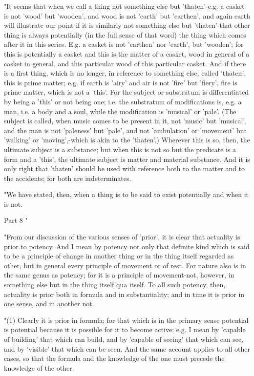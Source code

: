 "It seems that when we call a thing not something else but 'thaten'-e.g.
a casket is not 'wood' but 'wooden', and wood is not 'earth' but 'earthen',
and again earth will illustrate our point if it is similarly not something
else but 'thaten'-that other thing is always potentially (in the full
sense of that word) the thing which comes after it in this series.
E.g. a casket is not 'earthen' nor 'earth', but 'wooden'; for this
is potentially a casket and this is the matter of a casket, wood in
general of a casket in general, and this particular wood of this particular
casket. And if there is a first thing, which is no longer, in reference
to something else, called 'thaten', this is prime matter; e.g. if
earth is 'airy' and air is not 'fire' but 'fiery', fire is prime matter,
which is not a 'this'. For the subject or substratum is differentiated
by being a 'this' or not being one; i.e. the substratum of modifications
is, e.g. a man, i.e. a body and a soul, while the modification is
'musical' or 'pale'. (The subject is called, when music comes to be
present in it, not 'music' but 'musical', and the man is not 'paleness'
but 'pale', and not 'ambulation' or 'movement' but 'walking' or 'moving',-which
is akin to the 'thaten'.) Wherever this is so, then, the ultimate
subject is a substance; but when this is not so but the predicate
is a form and a 'this', the ultimate subject is matter and material
substance. And it is only right that 'thaten' should be used with
reference both to the matter and to the accidents; for both are indeterminates.

"We have stated, then, when a thing is to be said to exist potentially
and when it is not. 

Part 8 "

"From our discussion of the various senses of 'prior', it is clear
that actuality is prior to potency. And I mean by potency not only
that definite kind which is said to be a principle of change in another
thing or in the thing itself regarded as other, but in general every
principle of movement or of rest. For nature also is in the same genus
as potency; for it is a principle of movement-not, however, in something
else but in the thing itself qua itself. To all such potency, then,
actuality is prior both in formula and in substantiality; and in time
it is prior in one sense, and in another not. 

"(1) Clearly it is prior in formula; for that which is in the primary
sense potential is potential because it is possible for it to become
active; e.g. I mean by 'capable of building' that which can build,
and by 'capable of seeing' that which can see, and by 'visible' that
which can be seen. And the same account applies to all other cases,
so that the formula and the knowledge of the one must precede the
knowledge of the other. 


